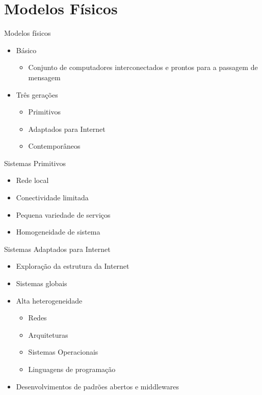 \documentclass[aspectratio=169,
				xcolor=table]{beamer}
\begin{document}
	\section{Modelos Físicos}
	\begin{frame}{Modelos físicos}
		\begin{itemize}
			\item Básico
			\begin{itemize}
				\item Conjunto de computadores interconectados e prontos para a passagem de mensagem
			\end{itemize}
			\vspace{1em}
			\item Três gerações
			\begin{itemize}
				\item Primitivos
				\item Adaptados para Internet
				\item Contemporâneos
			\end{itemize}
		\end{itemize}
	\end{frame}
	
	\begin{frame}{Sistemas Primitivos}
		\begin{itemize}
			\item Rede local
			\vspace{1em}
			\item Conectividade limitada
			\vspace{1em}
			\item Pequena variedade de serviços
			\vspace{1em}
			\item Homogeneidade de sistema
		\end{itemize}
	\end{frame}
	
	\begin{frame}{Sistemas Adaptados para Internet}
		\begin{itemize}
			\item Exploração da estrutura da Internet
			\vspace{1em}
			\item Sistemas globais
			\vspace{1em}
			\item Alta heterogeneidade
			\begin{itemize}
				\item Redes
				\item Arquiteturas
				\item Sistemas Operacionais
				\item Linguagens de programação
			\end{itemize}
			\vspace{1em}
			\item Desenvolvimentos de padrões abertos e middlewares
		\end{itemize}
	\end{frame}
	
\end{document}
